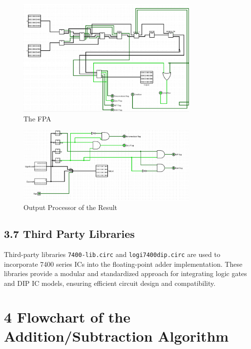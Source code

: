 \documentclass{article}
\begin{document}
\begin{figure}[h!]
    \centering
    \includegraphics[width=0.8\textwidth]{FPA_Circuit.png} %
    \caption{The FPA}
    \label{fig:fpa_circuit}
\end{figure}

\begin{figure}[h!]
    \centering
    \includegraphics[width=0.8\textwidth]{outputhandler.png} %
    \caption{Output Processor of the Result}
    \label{fig:output_processor}
\end{figure}







\subsection* {3.7 Third Party Libraries}
Third-party libraries \texttt{7400-lib.circ} and \texttt{logi7400dip.circ} are used to incorporate 7400 series ICs into the floating-point adder implementation. These libraries provide a modular and standardized approach for integrating logic gates and DIP IC models, ensuring efficient circuit design and compatibility.



\section*{4 Flowchart of the Addition/Subtraction Algorithm}
\end{document}
